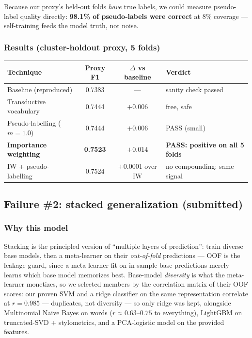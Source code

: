 \documentclass[11pt,a4paper]{article}
\begin{document}
Because our proxy's held-out folds \emph{have} true labels, we could measure pseudo-label quality directly: \textbf{98.1\% of pseudo-labels were correct} at 8\% coverage --- self-training feeds the model truth, not noise.

\subsubsection{Results (cluster-holdout proxy, 5 folds)}
\begin{center}
\begin{tabular}{lccl}
\toprule
Technique & Proxy F1 & $\Delta$ vs baseline & Verdict\\
\midrule
Baseline (reproduced) & 0.7383 & --- & sanity check passed\\
Transductive vocabulary & 0.7444 & $+0.006$ & free, safe\\
Pseudo-labelling ($m{=}1.0$) & 0.7444 & $+0.006$ & PASS (small)\\
\textbf{Importance weighting} & \textbf{0.7523} & $\mathbf{+0.014}$ & \textbf{PASS: positive on all 5 folds}\\
IW + pseudo-labelling & 0.7524 & $+0.0001$ over IW & no compounding: same signal\\
\bottomrule
\end{tabular}
\end{center}

\subsection{Failure \#2: stacked generalization (submitted)}\label{sec:stack}

\subsubsection{Why this model}
Stacking \cite{wolpert1992} is the principled version of ``multiple layers of prediction'': train diverse base models, then a meta-learner on their \emph{out-of-fold} predictions --- OOF is the leakage guard, since a meta-learner fit on in-sample base predictions merely learns which base model memorizes best. Base-model \emph{diversity} is what the meta-learner monetizes, so we selected members by the correlation matrix of their OOF scores: our proven SVM and a ridge classifier \cite{hoerl1970} on the same representation correlate at $r = 0.985$ --- duplicates, not diversity --- so only ridge was kept, alongside Multinomial Naive Bayes on words ($r \approx 0.63$--$0.75$ to everything), LightGBM on truncated-SVD \cite{halko2011} + stylometrics, and a PCA-logistic model on the provided features.
\end{document}
